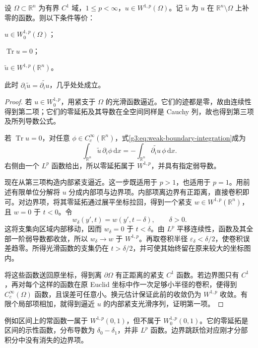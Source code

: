 \begin{theorem}\label{g3:thm:zero-trace-characterization}
	设 \(\Omega\subset\mathbb R^n\) 为有界 \(C^1\) 域，\(1\le p<\infty\)，\(u\in W^{1,p}(\Omega)\)。记 \(\widetilde u\) 为 \(u\) 在 \(\mathbb R^n\setminus\Omega\) 上补零的函数。则以下条件等价：
	\begin{equivalences}
		\item \(u\in W_0^{1,p}(\Omega)\)；
		\item \(\operatorname{Tr}u=0\)；
		\item \(\widetilde u\in W^{1,p}(\mathbb R^n)\)。
	\end{equivalences}
	此时 \(\partial_i\widetilde u=\widetilde{\partial_i u}\)，几乎处处成立。
\end{theorem}
\begin{proof}
	若 \(u\in W_0^{1,p}\)，用紧支于 \(\Omega\) 的光滑函数逼近。它们的迹都是零，故由连续性得到第二项；它们的零延拓及其导数在全空间同样是 Cauchy 列，故也得到第三项及所列导数公式。

	若 \(\operatorname{Tr}u=0\)，对任意 \(\phi\in C_c^\infty(\mathbb R^n)\)，式\eqref{g3:eq:weak-boundary-integration}成为
	\[
		\int_{\mathbb R^n}\widetilde u\,\partial_i\phi\,\mathrm dx
		=-\int_{\mathbb R^n}\widetilde{\partial_i u}\,\phi\,\mathrm dx.
	\]
	右侧由一个 \(L^p\) 函数给出，所以零延拓属于 \(W^{1,p}\)，并具有指定弱导数。

	现在从第三项构造内部紧支逼近。这一步既适用于 \(p>1\)，也适用于 \(p=1\)。用前述有限单位分解将 \(u\) 分成内部项与边界项。内部项离边界有正距离，直接卷积即可。对边界项，将其零延拓通过展平坐标拉回，得到一个紧支 \(w\in W^{1,p}(\mathbb R^n)\)，且 \(w=0\) 于 \(t<0\)。令
	\[
		w_\delta(y',t)=w(y',t-\delta),\qquad \delta>0.
	\]
	这将支集向区域内部移动，因而 \(w_\delta=0\) 于 \(t<\delta\)。由 \(L^p\) 平移连续性，函数及其全部一阶弱导数都收敛，所以 \(w_\delta\to w\) 于 \(W^{1,p}\)。再取卷积半径 \(\varepsilon_\delta<\delta/2\)，使卷积误差趋零。所得光滑函数的支集仍在 \(t>\delta/2\)，并可使其始终留在原来较大的坐标图内。

	将这些函数送回原坐标，得到离 \(\partial\Omega\) 有正距离的紧支 \(C^1\) 函数。若边界图只有 \(C^1\)，再对每个这样的函数在原 Euclid 坐标中作一次足够小半径的卷积，便得到 \(C_c^\infty(\Omega)\) 函数，且误差可任意小。换元估计保证此前的收敛仍为 \(W^{1,p}\) 收敛。有限个局部项相加，就得到逼近 \(u\) 的内部紧支光滑序列，证明第一项。
\end{proof}

例如区间上的常函数一属于 \(W^{1,p}(0,1)\)，但不属于 \(W_0^{1,p}(0,1)\)。它的零延拓是区间的示性函数，分布导数为 \(\delta_0-\delta_1\)，并非 \(L^p\) 函数。边界跳跃恰对应刚才分部积分中没有消失的边界项。

